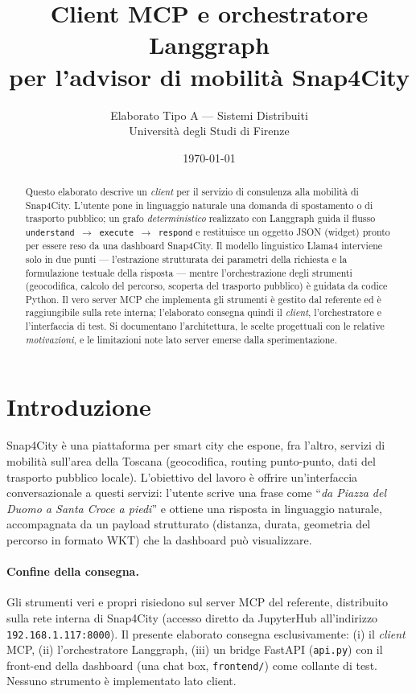 \documentclass[11pt,a4paper]{article}
\title{\textbf{Client MCP e orchestratore Langgraph\\ per l'advisor di mobilità Snap4City}}
\author{Elaborato Tipo A --- Sistemi Distribuiti\\ Università degli Studi di Firenze}
\date{\today}
\begin{document}
\maketitle

\begin{abstract}
\noindent
Questo elaborato descrive un \emph{client} per il servizio di consulenza alla
mobilità di Snap4City. L'utente pone in linguaggio naturale una domanda di
spostamento o di trasporto pubblico; un grafo \emph{deterministico} realizzato
con Langgraph guida il flusso \texttt{understand $\rightarrow$ execute
$\rightarrow$ respond} e restituisce un oggetto JSON (widget) pronto per essere
reso da una dashboard Snap4City. Il modello linguistico Llama4 interviene solo
in due punti --- l'estrazione strutturata dei parametri della richiesta e la
formulazione testuale della risposta --- mentre l'orchestrazione degli strumenti
(geocodifica, calcolo del percorso, scoperta del trasporto pubblico) è guidata
da codice Python. Il vero server MCP che implementa gli strumenti è gestito dal
referente ed è raggiungibile sulla rete interna; l'elaborato consegna quindi il
\emph{client}, l'orchestratore e l'interfaccia di test. Si documentano
l'architettura, le scelte progettuali con le relative \emph{motivazioni}, e le
limitazioni note lato server emerse dalla sperimentazione.
\end{abstract}

\tableofcontents
\bigskip

\section{Introduzione}
Snap4City è una piattaforma per smart city che espone, fra l'altro, servizi di
mobilità sull'area della Toscana (geocodifica, routing punto-punto, dati del
trasporto pubblico locale). L'obiettivo del lavoro è offrire un'interfaccia
conversazionale a questi servizi: l'utente scrive una frase come
``\textit{da Piazza del Duomo a Santa Croce a piedi}'' e ottiene una risposta in
linguaggio naturale, accompagnata da un payload strutturato (distanza, durata,
geometria del percorso in formato WKT) che la dashboard può visualizzare.

\paragraph{Confine della consegna.} Gli strumenti veri e propri risiedono sul
server MCP del referente, distribuito sulla rete interna di Snap4City
(accesso diretto da JupyterHub all'indirizzo \texttt{192.168.1.117:8000}). Il
presente elaborato consegna esclusivamente: (i) il \emph{client} MCP, (ii)
l'orchestratore Langgraph, (iii) un bridge FastAPI (\texttt{api.py}) con il
front-end della dashboard (una chat box, \texttt{frontend/}) come collante di
test. Nessuno strumento è implementato lato client.
\end{document}
